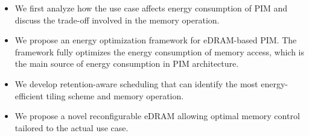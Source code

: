 \begin{itemize}
    \item We first analyze how the use case affects energy consumption of PIM and discuss the trade-off involved in the memory operation.
    \item We propose an energy optimization framework for eDRAM-based PIM. The \sysname framework fully optimizes the energy consumption of memory access, which is the main source of energy consumption in PIM architecture.
    \item We develop retention-aware scheduling that can identify the most energy-efficient tiling scheme and memory operation.
    \item We propose a novel reconfigurable eDRAM allowing optimal memory control tailored to the actual use case.
\end{itemize}

